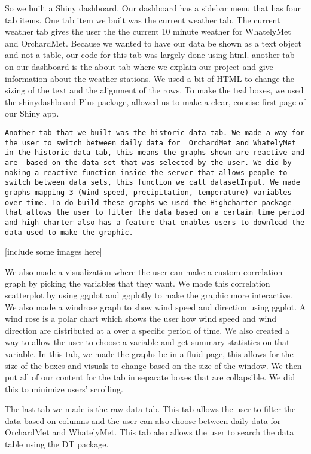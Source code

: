 \documentclass[10pt,letterpaper]{article}
\begin{document}
So we built a Shiny dashboard. Our dashboard has a sidebar menu that has
four tab items. One tab item we built was the current weather tab. The
current weather tab gives the user the the current 10 minute weather for
WhatelyMet and OrchardMet. Because we wanted to have our data be shown
as a text object and not a table, our code for this tab was largely done
using html. another tab on our dashboard is the about tab where we
explain our project and give information about the weather stations. We
used a bit of HTML to change the sizing of the text and the alignment of
the rows. To make the teal boxes, we used the shinydashboard Plus
package, allowed us to make a clear, concise first page of our Shiny
app.

\begin{verbatim}
Another tab that we built was the historic data tab. We made a way for the user to switch between daily data for  OrchardMet and WhatelyMet in the historic data tab, this means the graphs shown are reactive and are  based on the data set that was selected by the user. We did by making a reactive function inside the server that allows people to switch between data sets, this function we call datasetInput. We made graphs mapping 3 (Wind speed, precipitation, temperature) variables over time. To do build these graphs we used the Highcharter package that allows the user to filter the data based on a certain time period and high charter also has a feature that enables users to download the data used to make the graphic. 
\end{verbatim}

{[}include some images here{]}

We also made a visualization where the user can make a custom
correlation graph by picking the variables that they want. We made this
correlation scatterplot by using ggplot and ggplotly to make the graphic
more interactive. We also made a windrose graph to show wind speed and
direction using ggplot. A wind rose is a polar chart which shows the
user how wind speed and wind direction are distributed at a over a
specific period of time. We also created a way to allow the user to
choose a variable and get summary statistics on that variable. In this
tab, we made the graphs be in a fluid page, this allows for the size of
the boxes and visuals to change based on the size of the window. We then
put all of our content for the tab in separate boxes that are
collapsible. We did this to minimize users' scrolling.

The last tab we made is the raw data tab. This tab allows the user to
filter the data based on columns and the user can also choose between
daily data for OrchardMet and WhatelyMet. This tab also allows the user
to search the data table using the DT package.
\end{document}
